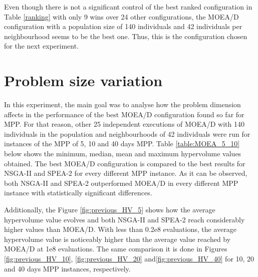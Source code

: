 Even though there is not a significant control of the best ranked configuration in Table \ref{ranking} with only 9 wins over 24 other configurations, the MOEA/D configuration with a population size of 140 individuals and 42 individuals per neighbourhood seems to be the best one. Thus, this is the configuration chosen for the next experiment.


\newpage

\section{Problem size variation}
In this experiment, the main goal was to analyse how the problem dimension affects in the performance of the best MOEA/D configuration found so far for MPP. For that reason, other 25 independent executions of MOEA/D with 140 individuals in the population and neighbourhoods of 42 individuals were run for instances of the MPP of 5, 10 and 40 days MPP. Table \ref{table:MOEA_5_10} below shows the minimum, median, mean and maximum hypervolume values obtained. The best MOEA/D configuration is compared to the best results for NSGA-II and SPEA-2 for every different MPP instance. As it can be observed, both NSGA-II and SPEA-2 outperformed MOEA/D in every different MPP instance with statistically significant differences.




%
%

Additionally, the Figure \ref{fig:previous_HV_5} shows how the average hypervolume value evolves and both NSGA-II and SPEA-2 reach considerably higher values than MOEA/D. With less than 0.2e8 evaluations, the average hypervolume value is noticeably higher than the average value reached by MOEA/D at 1e8 evaluations. The same comparison it is done in Figures \ref{fig:previous_HV_10}, \ref{fig:previous_HV_20} and\ref{fig:previous_HV_40} for 10, 20 and 40 days MPP instances, respectively.

